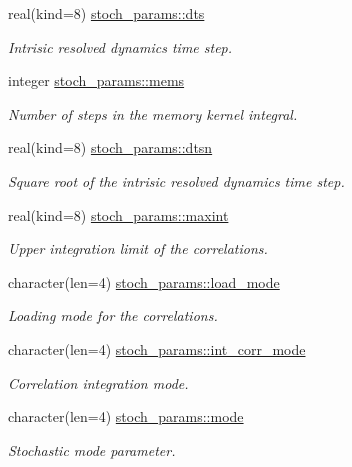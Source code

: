 \begin{DoxyCompactItemize}
real(kind=8) \hyperlink{namespacestoch__params_a760f666f9c629b98214821c8186f6ffc}{stoch\+\_\+params\+::dts}
\begin{DoxyCompactList}\small\item\em Intrisic resolved dynamics time step. \end{DoxyCompactList}\item 
integer \hyperlink{namespacestoch__params_a1e5a5dc39327df54fe21be20d06cea47}{stoch\+\_\+params\+::mems}
\begin{DoxyCompactList}\small\item\em Number of steps in the memory kernel integral. \end{DoxyCompactList}\item 
real(kind=8) \hyperlink{namespacestoch__params_a53aa511c9ceefb077d913bf728b3f516}{stoch\+\_\+params\+::dtsn}
\begin{DoxyCompactList}\small\item\em Square root of the intrisic resolved dynamics time step. \end{DoxyCompactList}\item 
real(kind=8) \hyperlink{namespacestoch__params_a50976593e79387f25e08fef6ce56b30b}{stoch\+\_\+params\+::maxint}
\begin{DoxyCompactList}\small\item\em Upper integration limit of the correlations. \end{DoxyCompactList}\item 
character(len=4) \hyperlink{namespacestoch__params_ac61a48744a1bb015b5148c421837fbe7}{stoch\+\_\+params\+::load\+\_\+mode}
\begin{DoxyCompactList}\small\item\em Loading mode for the correlations. \end{DoxyCompactList}\item 
character(len=4) \hyperlink{namespacestoch__params_ab901db3992a4df88db5a67fdd7be6ac6}{stoch\+\_\+params\+::int\+\_\+corr\+\_\+mode}
\begin{DoxyCompactList}\small\item\em Correlation integration mode. \end{DoxyCompactList}\item 
character(len=4) \hyperlink{namespacestoch__params_a2c3f6439fd2d66413d065b533f2a6263}{stoch\+\_\+params\+::mode}
\begin{DoxyCompactList}\small\item\em Stochastic mode parameter. \end{DoxyCompactList}\end{DoxyCompactItemize}
